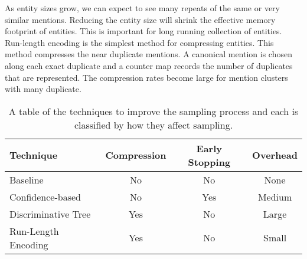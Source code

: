 As entity sizes grow, we can expect to see many repeats of the same or very similar mentions.
Reducing the entity size will shrink the effective memory footprint of entities.
This is important for long running collection of entities.
Run-length encoding is the simplest method for compressing entities.
This method compresses the near duplicate mentions.
A canonical mention is chosen along each exact duplicate and a counter map records the number of duplicates that are represented.
The compression rates become large for mention clusters with many duplicate.




\begin{table*}[t]
\centering
\begin{tabular}{l| c c c}
\textbf{Technique} &
\textbf{Compression} &
\textbf{Early Stopping} &
\textbf{Overhead}\\
\hline
Baseline & No & No & None \\
Confidence-based~\cite{singh2012monte} & No & Yes & Medium\\
Discriminative Tree~\cite{wick2013discriminative} & Yes & No & Large\\
Run-Length Encoding & Yes & No & Small\\
\end{tabular}
\caption{A table of the techniques to improve the sampling process and each is classified by how they affect sampling.}
\label{tab:acceleration-approach}
\end{table*}


